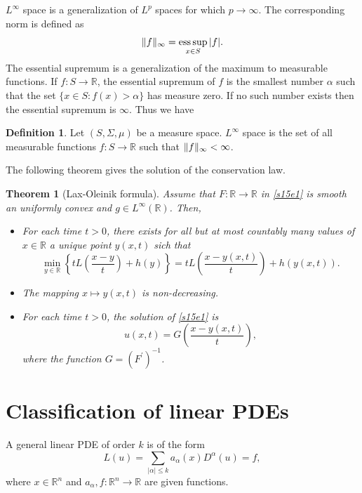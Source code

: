 \documentclass{article}
\DeclarePairedDelimiter\norm{\lVert}{\rVert}
\DeclareMathOperator*{\esssup}{ess\,sup}
\theoremstyle{plain}
\newtheorem{thm}{Theorem}
\numberwithin{thm}{section}
\theoremstyle{plain}
\numberwithin{prop}{section}
\theoremstyle{definition}
\newtheorem{defn}{Definition}
\numberwithin{defn}{section}
\theoremstyle{remark}
\numberwithin{equation}{section}
\begin{document}
$L^\infty$ space is a generalization of $L^p$ spaces for which $p \rightarrow \infty$. The 
corresponding norm is defined as
\begin{equation}\label{s18e3}
\norm{f}_\infty = \esssup_{x \in S} |f|.
\end{equation}
The essential supremum is a generalization of the maximum to measurable functions. If $f:S 
\rightarrow \mathbb{R}$, the essential supremum of $f$ is the smallest number $\alpha$ such that
the set $\{x \in S : f(x) > \alpha\}$ has measure zero. If no such number exists then the essential
supremum is $\infty$. Thus we have
\begin{defn}\label{s18d2}
Let $(S, \Sigma, \mu)$ be a measure space. $L^\infty$ space is the set of all measurable functions
$f: S \rightarrow \mathbb{R}$ such that $\norm{f}_\infty < \infty$. 

The following theorem gives the solution of the conservation law.
\begin{thm}[Lax-Oleinik formula]\label{s18t1}
Assume that $F: \mathbb{R} \rightarrow \mathbb{R}$ in \eqref{s15e1} is smooth an uniformly convex
and $g \in L^\infty(\mathbb{R})$. Then,
\begin{itemize}
\item[(i)] For each time $t > 0$, there exists for all but at most countably many values of $x \in
\mathbb{R}$ a unique point $y(x, t)$ sich that
\[
\min_{y \in \mathbb{R}}\left\{tL\left(\frac{x - y}{t}\right) + h(y)\right\} = 
tL\left(\frac{x - y(x,t)}{t}\right) + h(y(x, t)).
\]
\item[(ii)] The mapping $x \mapsto y(x, t)$ is non-decreasing.
\item[(iii)] For each time $t > 0$, the solution of \eqref{s15e1} is
\[
u(x, t) = G\left(\frac{x - y(x, t)}{t}\right),
\]
where the function $G = (F^\prime)^{-1}$.
\end{itemize}
\end{thm}
\end{defn}

\section{Classification of linear PDEs}\label{s19}
A general linear PDE of order $k$ is of the form
\begin{equation}\label{s19e1}
L(u) = \sum_{|\alpha| \le k} a_\alpha(x) D^\alpha(u) = f,
\end{equation}
where $x \in \mathbb{R}^n$ and $a_\alpha, f: \mathbb{R}^n \rightarrow \mathbb{R}$ are given 
functions. 
\end{document}
